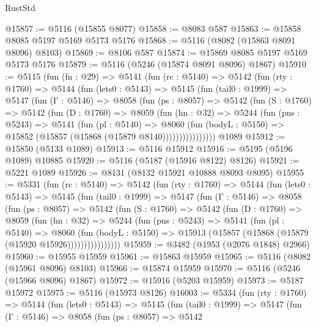 \begin{lexlean}{RustStd}
\begin{coremodule}
{\begin{coremodule}
{{{{{{{{{{{{{{{{{{{{{{{{{{{{{{{@15857 := @5116 (@15855 @8077)
@15858 := @8083 @587
@15863 := @15858 @8085 @5197 @5169 @5173 @5176
@15868 := @5116 (@8082 (@15863 @8091 @8096) @8103)
@15869 := @8106 @587
@15874 := @15869 @8085 @5197 @5169 @5173 @5176
@15879 := @5116 (@5246 (@15874 @8091 @8096) @1867)
@15910 := @5115
    (fun (fn : @29) =>
    @5141
      (fun (rc : @5140) =>
      @5142
        (fun (rty : @1760) =>
        @5144
          (fun (lets0 : @5143) =>
          @5145
            (fun (tail0 : @1999) =>
            @5147
              (fun (Γ : @5146) =>
              @8058
                (fun (ps : @8057) =>
                @5142
                  (fun (S : @1760) =>
                  @5142
                    (fun (D : @1760) =>
                    @8059
                      (fun (hn : @32) =>
                      @5244
                        (fun (pns : @5243) =>
                        @5141
                          (fun (pl : @5140) =>
                          @8060
                            (fun (bodyL : @5150) =>
                            @15852 (@15857 (@15868 (@15879 @8140))))))))))))))))
    @1089
@15912 := @15850 (@5133 @1089)
@15913 := @5116 @15912
@15916 := @5195 (@5196 @1089) @10885
@15920 := @5116 (@5187 (@15916 @8122) @8126)
@15921 := @5221 @1089
@15926 := @8131 (@8132 @15921 @10888 @8093 @8095)
@15955 := @5331
    (fun (rc : @5140) =>
    @5142
      (fun (rty : @1760) =>
      @5144
        (fun (lets0 : @5143) =>
        @5145
          (fun (tail0 : @1999) =>
          @5147
            (fun (Γ : @5146) =>
            @8058
              (fun (ps : @8057) =>
              @5142
                (fun (S : @1760) =>
                @5142
                  (fun (D : @1760) =>
                  @8059
                    (fun (hn : @32) =>
                    @5244
                      (fun (pns : @5243) =>
                      @5141
                        (fun (pl : @5140) =>
                        @8060
                          (fun (bodyL : @5150) =>
                          @15913 (@15857 (@15868 (@15879 (@15920 @15926))))))))))))))))
@15959 := @3482 (@1953 (@2076 @1848) @2966)
@15960 := @15955 @15959
@15961 := @15863 @15959
@15965 := @5116 (@8082 (@15961 @8096) @8103)
@15966 := @15874 @15959
@15970 := @5116 (@5246 (@15966 @8096) @1867)
@15972 := @15916 (@5203 @15959)
@15973 := @5187 @15972
@15975 := @5116 (@15973 @8126)
@16003 := @5334
    (fun (rty : @1760) =>
    @5144
      (fun (lets0 : @5143) =>
      @5145
        (fun (tail0 : @1999) =>
        @5147
          (fun (Γ : @5146) =>
          @8058
            (fun (ps : @8057) =>
            @5142
}}}}}}}}}}}}}}}}}}}}}}}}}}}}}}}
\end{coremodule}}
\end{coremodule}
\end{lexlean}
